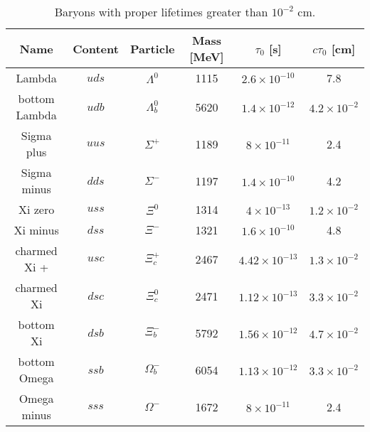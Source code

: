 \begin{table}
\caption{Baryons with proper lifetimes greater than $10^{-2}$ cm.} 
\begin{center}
\begin{tabular}{cccccc}
\textbf{Name}          & \textbf{Content} & \textbf{Particle}      & \textbf{Mass} [MeV] &  $\tau_{0}$ [s] & $c\tau_{0}$ [cm] \\
\hline 
Lambda        & $uds$   & $\Lambda^0$   & 1115       & $2.6 \times 10^{-10}$    & 7.8                  \\
bottom Lambda & $udb$   & $\Lambda^0_b$ & 5620       & $1.4 \times 10^{-12}$    & $4.2 \times 10^{-2}$ \\
\hline
Sigma plus    & $uus$   & $\Sigma^{+}$  & 1189       & $8 \times 10^{-11}$      & 2.4                  \\
Sigma minus   & $dds$   & $\Sigma^{-}$  & 1197       & $1.4\times 10^{-10}$     & 4.2                  \\
\hline 
Xi zero       & $uss$   & $\Xi^0$       & 1314       & $4 \times 10^{-13}$      & $1.2 \times 10^{-2}$ \\
Xi minus      & $dss$   & $\Xi^-$       & 1321       & $1.6 \times 10^{-10}$    & 4.8                  \\
charmed Xi +  & $usc$   & $\Xi^{+}_c$   & 2467       & $4.42 \times 10^{-13}$   & $1.3 \times 10^{-2}$ \\
charmed Xi    & $dsc$   & $\Xi^0_c$     & 2471       & $1.12 \times 10^{-13}$   & $3.3 \times 10^{-2}$ \\
bottom Xi     & $dsb$   & $\Xi^-_b$     & 5792       & $1.56 \times 10^{-12}$   & $4.7 \times 10^{-2}$ \\
\hline
bottom Omega  & $ssb$   & $\Omega_b^-$  & 6054       & $1.13 \times 10^{-12}$   & $3.3 \times 10^{-2}$ \\
Omega minus   & $sss$   & $\Omega^-$    & 1672       & $8 \times 10^{-11}$      & 2.4                  \\
\end{tabular}
\end{center}
\label{tab:baryons}
\end{table}
